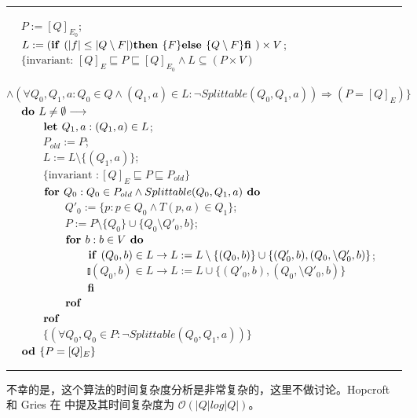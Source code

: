 \\
\rule{\textwidth}{1pt}
\mbox{　} $P:=[Q]_{E_0}$; \\
\mbox{　} $L:= ( \mbox{\textbf{if }} ( |f| \leq |Q \setminus F | ) \mbox{\textbf{then }} \{F\} \mbox{\textbf{else }} \{ Q \setminus F \} \mbox{\textbf{fi }} ) \times V $; \\
\mbox{　} $ \{ \mbox{invariant: } [Q]_E \sqsubseteq P \sqsubseteq [Q]_{E_0} \land L \subseteq (P \times V) $ \\
\mbox{　　　} $ \land (\forall Q_0,Q_1,a:Q_0 \in Q \land (Q_1,a) \in L : \neg Splittable (Q_0,Q_1,a)) \Rightarrow (P=[Q]_E) \} $ \\
\mbox{　} $ \mbox{\textbf{do }} L \not= \emptyset \longrightarrow $ \\ 
\mbox{　　　} $ \mbox{\textbf{let }} Q_1,a:(Q_1,a) \in L $; \\
\mbox{　　　} $ P_{old} := P $; \\
\mbox{　　　} $ L := L \setminus \{ (Q_1,a) \} $; \\
\mbox{　　　} $ \{  \mbox{invariant }: [Q]_E \sqsubseteq P \sqsubseteq P_{old} \} $ \\
\mbox{　　　} $ \mbox{\textbf{for }} Q_0 : Q_0 \in P_{old} \land Splittable (Q_0,Q_1,a) \mbox{\textbf{ do }} $ \\
\mbox{　　　　　} $ Q'_0 := \{ p:p \in Q_0 \land T(p,a) \in Q_1 \} $; \\
\mbox{　　　　　} $ P:= P \setminus \{ Q_0 \} \cup \{ Q_0 \setminus Q'_0,b \} $;\\
\mbox{　　　　　} $ \mbox{\textbf{for }} b:b \in V \mbox{\textbf{ do }} $ \\
\mbox{　　　　　　　} $ \mbox{\textbf{if }} (Q_0,b) \in L \rightarrow L := L \setminus \{ (Q_0,b) \} \cup \{ (Q'_0,b),(Q_0, \setminus Q'_0,b ) \} $;\\ 
\mbox{　　　　　　　} $ \talloblong (Q_0,b) \in L \rightarrow L := L \cup \{ (Q'_0,b),(Q_0, \setminus Q'_0,b ) \} $ \\
\mbox{　　　　　　　} $ \mbox{\textbf{fi}} $ \\
\mbox{　　　　　} $ \mbox{\textbf{rof}} $ \\
\mbox{　　　} $ \mbox{\textbf{rof}} $ \\
\mbox{　　　} $ \{ (\forall Q_0,Q_0 \in P : \neg Splittable(Q_0,Q_1,a)) \} $ \\
\mbox{　} $ \mbox{\textbf{od }} \{ P = [Q]_E \} $ \\
\rule{\textwidth}{1pt}
不幸的是，这个算法的时间复杂度分析是非常复杂的，这里不做讨论。Hopcroft 和 Gries 在 \cite{Grie73,Hopc71} 中提及其时间复杂度为 $ \mathcal{O}(|Q|log|Q|) $。



